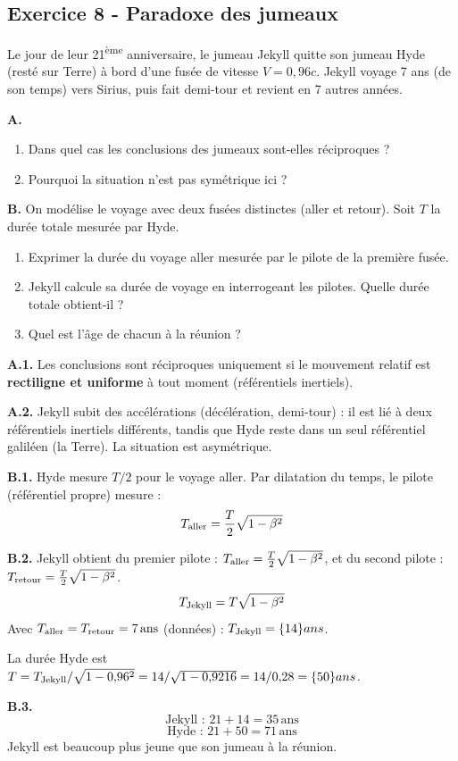 \documentclass[12pt,a4paper]{article}
\begin{document}
\subsection*{Exercice 8 - Paradoxe des jumeaux \niveau{\difficile}}

\begin{boiteexercice}
Le jour de leur 21\textsuperscript{ème} anniversaire, le jumeau Jekyll quitte son jumeau Hyde (resté sur Terre) à bord d'une fusée de vitesse $V = 0{,}96c$. Jekyll voyage 7 ans (de son temps) vers Sirius, puis fait demi-tour et revient en 7 autres années.

\textbf{A.}
\begin{enumerate}
  \item Dans quel cas les conclusions des jumeaux sont-elles réciproques ?
  \item Pourquoi la situation n'est pas symétrique ici ?
\end{enumerate}
\textbf{B.} On modélise le voyage avec deux fusées distinctes (aller et retour). Soit $T$ la durée totale mesurée par Hyde.
\begin{enumerate}
  \item Exprimer la durée du voyage aller mesurée par le pilote de la première fusée.
  \item Jekyll calcule sa durée de voyage en interrogeant les pilotes. Quelle durée totale obtient-il ?
  \item Quel est l'âge de chacun à la réunion ?
\end{enumerate}
\end{boiteexercice}

\begin{boitecorrige}
\textbf{A.1.} Les conclusions sont réciproques uniquement si le mouvement relatif est \textbf{rectiligne et uniforme} à tout moment (référentiels inertiels).

\textbf{A.2.} Jekyll subit des accélérations (décélération, demi-tour) : il est lié à deux référentiels inertiels différents, tandis que Hyde reste dans un seul référentiel galiléen (la Terre). La situation est asymétrique.

\textbf{B.1.} Hyde mesure $T/2$ pour le voyage aller. Par dilatation du temps, le pilote (référentiel propre) mesure :
\[
T_{\rm aller} = \frac{T}{2}\sqrt{1-\beta^2}
\]

\textbf{B.2.} Jekyll obtient du premier pilote : $T_{\rm aller} = \frac{T}{2}\sqrt{1-\beta^2}$, et du second pilote : $T_{\rm retour} = \frac{T}{2}\sqrt{1-\beta^2}$.
\[
T_{\rm Jekyll} = T\sqrt{1-\beta^2}
\]
Avec $T_{\rm aller} = T_{\rm retour} = 7\,\text{ans}$ (données) : $T_{\rm Jekyll} = \qty{14}{ans}$.

La durée Hyde est $T = T_{\rm Jekyll}/\sqrt{1-0{,}96^2} = 14/\sqrt{1-0{,}9216} = 14/0{,}28 = \qty{50}{ans}$.

\textbf{B.3.}
\[
\text{Jekyll : } 21 + 14 = \boxed{35\,\text{ans}}
\]
\[
\text{Hyde : } 21 + 50 = \boxed{71\,\text{ans}}
\]
Jekyll est beaucoup plus jeune que son jumeau à la réunion.
\end{boitecorrige}
\end{document}
